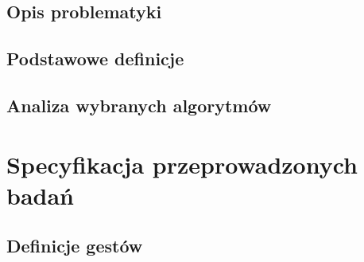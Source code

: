 \section{Opis problematyki}\label{Section_Problematyka}
\cite{TrackingClusteringGpu10}

\section{Podstawowe definicje}\label{Section_Definicje}
\cite{SalientPointsTracking05}

\section{Analiza wybranych algorytmów}\label{Section_Algorytmy}

\subsection{}\label{Subsection_}
\cite{SalientPointsTracking05}

\subsection{}\label{Subsection_}
\cite{OpticalFlowNonPriori05}

\subsection{}\label{Subsection_}
\cite{HandTrackingVitterbi05}

\subsection{}\label{Subsection_}
\cite{FingertipParticleFilter11}
\cite{ParticleFilter05}

\subsection{}\label{Subsection_}
\cite{TwoStageRandomizedTrees11}
\cite{RandomizedTrees06}

\chapter{Specyfikacja przeprowadzonych badań}\label{Chapter_SpecyfikacjaPrzeprowadzonychBadan}

\section{Definicje gestów}\label{Section_DefinicjeGestow}

